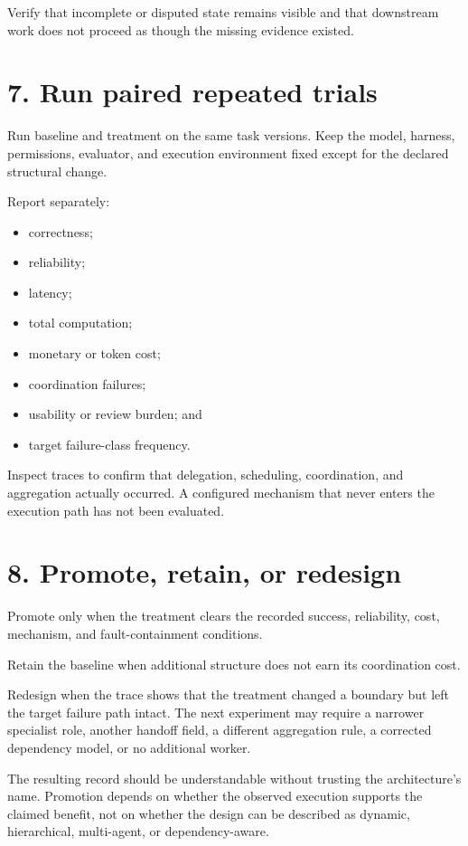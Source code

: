 Verify that incomplete or disputed state remains visible and that downstream work does not proceed as though the missing evidence existed.

\section{7. Run paired repeated trials}\label{run-paired-repeated-trials}

Run baseline and treatment on the same task versions. Keep the model, harness, permissions, evaluator, and execution environment fixed except for the declared structural change.

Report separately:

\begin{itemize}
\tightlist
\item
  correctness;
\item
  reliability;
\item
  latency;
\item
  total computation;
\item
  monetary or token cost;
\item
  coordination failures;
\item
  usability or review burden; and
\item
  target failure-class frequency.
\end{itemize}

Inspect traces to confirm that delegation, scheduling, coordination, and aggregation actually occurred. A configured mechanism that never enters the execution path has not been evaluated.

\section{8. Promote, retain, or redesign}\label{promote-retain-or-redesign}

Promote only when the treatment clears the recorded success, reliability, cost, mechanism, and fault-containment conditions.

Retain the baseline when additional structure does not earn its coordination cost.

Redesign when the trace shows that the treatment changed a boundary but left the target failure path intact. The next experiment may require a narrower specialist role, another handoff field, a different aggregation rule, a corrected dependency model, or no additional worker.

The resulting record should be understandable without trusting the architecture's name. Promotion depends on whether the observed execution supports the claimed benefit, not on whether the design can be described as dynamic, hierarchical, multi-agent, or dependency-aware.


